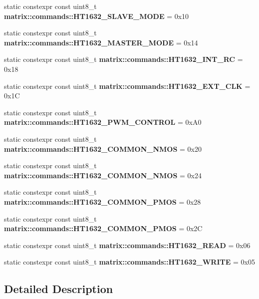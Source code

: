 \begin{DoxyCompactItemize}
\mbox{\label{group__commands_ga232d2ba6b62fe7b9bcee2891e3803f45}} 
static constexpr const uint8\+\_\+t {\bfseries matrix\+::commands\+::\+H\+T1632\+\_\+\+S\+L\+A\+V\+E\+\_\+\+M\+O\+DE} = 0x10
\item 
\mbox{\label{group__commands_gaae9ed40d710b020373fc60011c174b76}} 
static constexpr const uint8\+\_\+t {\bfseries matrix\+::commands\+::\+H\+T1632\+\_\+\+M\+A\+S\+T\+E\+R\+\_\+\+M\+O\+DE} = 0x14
\item 
\mbox{\label{group__commands_gab0324c769564b1fcaacf1d0317280b2d}} 
static constexpr const uint8\+\_\+t {\bfseries matrix\+::commands\+::\+H\+T1632\+\_\+\+I\+N\+T\+\_\+\+RC} = 0x18
\item 
\mbox{\label{group__commands_ga55a54ac9b9c5c414e460f40406da2abd}} 
static constexpr const uint8\+\_\+t {\bfseries matrix\+::commands\+::\+H\+T1632\+\_\+\+E\+X\+T\+\_\+\+C\+LK} = 0x1C
\item 
\mbox{\label{group__commands_gae678e56b243659bd534ff3c06bd24230}} 
static constexpr const uint8\+\_\+t {\bfseries matrix\+::commands\+::\+H\+T1632\+\_\+\+P\+W\+M\+\_\+\+C\+O\+N\+T\+R\+OL} = 0x\+A0
\item 
\mbox{\label{group__commands_gac32e508f154287a14981581036195f98}} 
static constexpr const uint8\+\_\+t {\bfseries matrix\+::commands\+::\+H\+T1632\+\_\+\+C\+O\+M\+M\+O\+N\+\_\+N\+M\+OS} = 0x20
\item 
\mbox{\label{group__commands_ga335b040af5b6d5d08a3d8e7cfcefafb6}} 
static constexpr const uint8\+\_\+t {\bfseries matrix\+::commands\+::\+H\+T1632\+\_\+\+C\+O\+M\+M\+O\+N\+\_\+N\+M\+OS} = 0x24
\item 
\mbox{\label{group__commands_ga439fb8f3fbc0284657493ee5a9a32734}} 
static constexpr const uint8\+\_\+t {\bfseries matrix\+::commands\+::\+H\+T1632\+\_\+\+C\+O\+M\+M\+O\+N\+\_\+P\+M\+OS} = 0x28
\item 
\mbox{\label{group__commands_ga155dfc224c3f6754a765947c6f1702d8}} 
static constexpr const uint8\+\_\+t {\bfseries matrix\+::commands\+::\+H\+T1632\+\_\+\+C\+O\+M\+M\+O\+N\+\_\+P\+M\+OS} = 0x2C
\item 
\mbox{\label{group__commands_gaa6c9954036785a39e04cd6aadf28dd47}} 
static constexpr const uint8\+\_\+t {\bfseries matrix\+::commands\+::\+H\+T1632\+\_\+\+R\+E\+AD} = 0x06
\item 
\mbox{\label{group__commands_ga3082d0a0f5764b209cc34aea66ccb3ac}} 
static constexpr const uint8\+\_\+t {\bfseries matrix\+::commands\+::\+H\+T1632\+\_\+\+W\+R\+I\+TE} = 0x05
\end{DoxyCompactItemize}


\subsection{Detailed Description}
